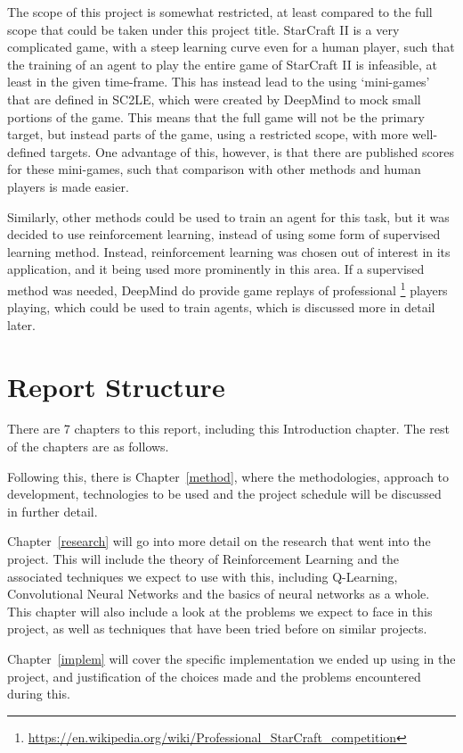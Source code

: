 The scope of this project is somewhat restricted, at least compared to the full
scope that could be taken under this project title. StarCraft II is a very
complicated game, with a steep learning curve even for a human player, such that
the training of an agent to play the entire game of StarCraft II is infeasible,
at least in the given time-frame. This has instead lead to the using
`mini-games' that are defined in SC2LE, which were created by DeepMind to mock
small portions of the game. This means that the full game will not be the
primary target, but instead parts of the game, using a restricted scope, with
more well-defined targets.  One advantage of this, however, is that there are
published scores for these mini-games, such that comparison with other methods
and human players is made easier.

Similarly, other methods could be used to train an agent for this task, but it
was decided to use reinforcement learning, instead of using some form of
supervised learning method. Instead, reinforcement learning was chosen out of
interest in its application, and it being used more prominently in this area.
If a supervised method was needed, DeepMind do provide game replays of
professional%
\footnote{\url{https://en.wikipedia.org/wiki/Professional_StarCraft_competition}}
players playing, which could be used to train agents, which is discussed more in
detail later.

\section{Report Structure}

There are 7 chapters to this report, including this Introduction chapter.
The rest of the chapters are as follows.

Following this, there is Chapter~\ref{method}, where the methodologies, approach
to development, technologies to be used and the project schedule will be
discussed in further detail.

Chapter~\ref{research} will go into more detail on the research that went into
the project. This will include the theory of Reinforcement Learning and the
associated techniques we expect to use with this, including Q-Learning,
Convolutional Neural Networks and the basics of neural networks as a whole. This
chapter will also include a look at the problems we expect to face in this
project, as well as techniques that have been tried before on similar projects.

Chapter~\ref{implem} will cover the specific implementation we ended up using in
the project, and justification of the choices made and the problems encountered
during this.

